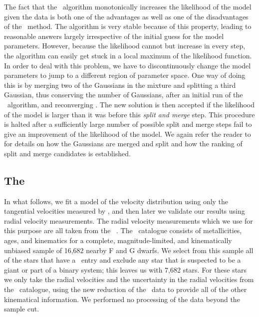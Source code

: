 The fact that the \EM\ algorithm monotonically increases the
likelihood of the model given the data is both one of the advantages
as well as one of the disadvantages of the \EM\ method. The algorithm
is very stable because of this property, leading to reasonable answers
largely irrespective of the initial guess for the model
parameters. However, because the likelihood cannot but increase in
every step, the algorithm can easily get stuck in a local maximum of
the likelihood function. In order to deal with this problem, we have
to discontinuously change the model parameters to jump to a different
region of parameter space. One way of doing this is by merging two of
the Gaussians in the mixture and splitting a third Gaussian, thus
conserving the number of Gaussians, after an initial run of the \EM\
algorithm, and reconverging \citep{Naonori1998}. The new solution is
then accepted if the likelihood of the model is larger than it was
before this \emph{split and merge} step. This procedure is halted
after a sufficiently large number of possible split and merge steps
fail to give an improvement of the likelihood of the model. We again
refer the reader to \citet{Bovy09a} for details on how the Gaussians
are merged and split and how the ranking of split and merge candidates
is established.



\subsection{The \gcs}\label{sec:gcs}

In what follows, we fit a model of the velocity distribution using
only the tangential velocities measured by \Hipparcos, and then later
we validate our results using radial velocity measurements. The radial
velocity measurements which we use for this purpose are all taken from
the \gcs\ \citep[\gcsabb;][]{2004A&A...418..989N}. The \gcsabb\
catalogue consists of metallicities, ages, and kinematics for a
complete, magnitude-limited, and kinematically unbiased sample of
16,682 nearby F and G dwarfs. We select from this sample all of the
stars that have a \Hipparcos\ entry and exclude any star that is
suspected to be a giant or part of a binary system; this leaves us
with 7,682 stars. For these stars we only take the radial velocities
and the uncertainty in the radial velocities from the \gcsabb\
catalogue, using the new reduction of the \Hipparcos\ data to provide
all of the other kinematical information. We performed no processing
of the data beyond the sample cut.



